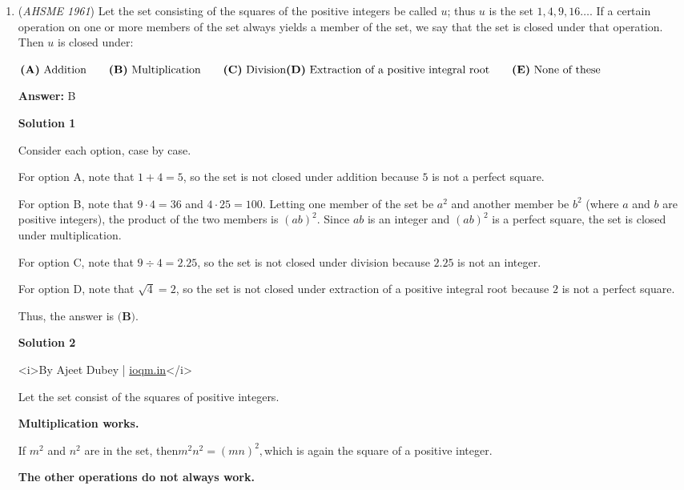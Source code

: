 \begin{enumerate}
 Thus the answer is $\boxed{\textbf{(E)}}$.

 


	\item (\textit{AHSME 1961}) Let the set consisting of the squares of the positive integers be called $u$; thus $u$ is the set $1, 4, 9, 16 \ldots$. 
If a certain operation on one or more members of the set always yields a member of the set, 
we say that the set is closed under that operation. Then $u$ is closed under:


 $\textbf{(A)}\ \text{Addition}\qquad \textbf{(B)}\ \text{Multiplication} \qquad \textbf{(C)}\ \text{Division} \qquad\\ \textbf{(D)}\ \text{Extraction of a positive integral root}\qquad \textbf{(E)}\ \text{None of these}$

 \textbf{Answer: }B



\textbf{Solution 1}

Consider each option, case by case.

 For option A, note that $1 + 4 = 5$, so the set is not closed under addition because $5$ is not a perfect square.

 For option B, note that $9 \cdot 4 = 36$ and $4 \cdot 25 = 100$.  Letting one member of the set be $a^2$ and another member be $b^2$ (where $a$ and $b$ are positive integers), the product of the two members is $(ab)^2$.  Since $ab$ is an integer and $(ab)^2$ is a perfect square, the set is closed under multiplication.

 For option C, note that $9 \div 4 = 2.25$, so the set is not closed under division because $2.25$ is not an integer.

 For option D, note that $\sqrt{4} = 2$, so the set is not closed under extraction of a positive integral root because $2$ is not a perfect square.

 Thus, the answer is $\boxed{\textbf{(B)}}$.

 



\textbf{Solution 2}

<i>By Ajeet Dubey | \href{https://ioqm.in}{ioqm.in}</i>

 Let the set consist of the squares of positive integers.

 \textbf{Multiplication works.}

 If $m^2$ and $n^2$ are in the set, then$m^2n^2=(mn)^2,$which is again the square of a positive integer.

 \textbf{The other operations do not always work.}


\end{enumerate}
